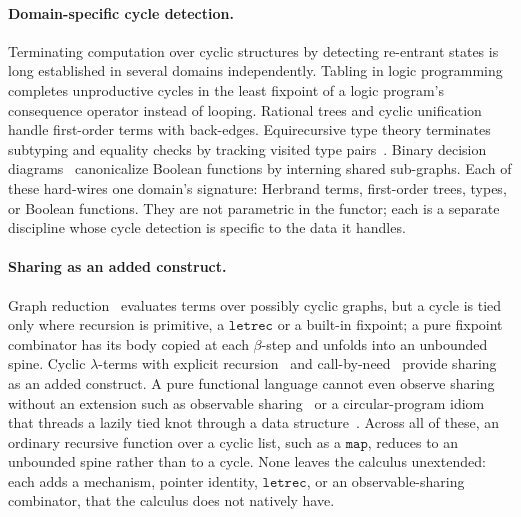 \paragraph{Domain-specific cycle detection.}
Terminating computation over cyclic structures by detecting re-entrant states is long established in several domains independently. Tabling in logic programming~\cite{tamaki-sato,tabling-slg,vanemden-kowalski} completes unproductive cycles in the least fixpoint of a logic program's consequence operator instead of looping. Rational trees and cyclic unification~\cite{colmerauer1984-trees,courcelle1983-infinite-trees} handle first-order terms with back-edges. Equirecursive type theory terminates subtyping and equality checks by tracking visited type pairs~\cite{amadio1993-subtyping-recursive-types,brandt1998-coinductive-type-equality}. Binary decision diagrams~\cite{bryant1986-bdd} canonicalize Boolean functions by interning shared sub-graphs. Each of these hard-wires one domain's signature: Herbrand terms, first-order trees, types, or Boolean functions. They are not parametric in the functor; each is a separate discipline whose cycle detection is specific to the data it handles.

\paragraph{Sharing as an added construct.}
Graph reduction~\cite{wadsworth-graph} evaluates terms over possibly cyclic graphs, but a cycle is tied only where recursion is primitive, a $\mathtt{letrec}$ or a built-in fixpoint; a pure fixpoint combinator has its body copied at each $\beta$-step and unfolds into an unbounded spine. Cyclic $\lambda$-terms with explicit recursion~\cite{ariola1997-explicit-recursion} and call-by-need~\cite{ariola-felleisen} provide sharing as an added construct. A pure functional language cannot even observe sharing without an extension such as observable sharing~\cite{gill} or a circular-program idiom that threads a lazily tied knot through a data structure~\cite{bird}. Across all of these, an ordinary recursive function over a cyclic list, such as a $\mathtt{map}$, reduces to an unbounded spine rather than to a cycle. None leaves the calculus unextended: each adds a mechanism, pointer identity, $\mathtt{letrec}$, or an observable-sharing combinator, that the calculus does not natively have.


